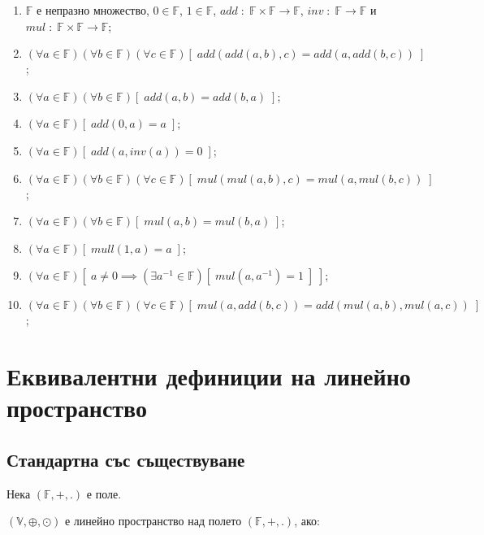 \documentclass{article}[12pt]
\begin{document}
\begin{enumerate}
\item \(\mathbb{F}\) е непразно множество, \(0 \in \mathbb{F}\), \(1 \in \mathbb{F}\), \(add \; : \; \mathbb{F} \times \mathbb{F} \to \mathbb{F}\), \(inv \; : \; \mathbb{F} \to \mathbb{F}\) и \(mul \; : \; \mathbb{F} \times \mathbb{F} \to \mathbb{F}\);
\item \((\forall a \in \mathbb{F})(\forall b \in \mathbb{F})(\forall c \in \mathbb{F})[\; add(add(a, b), c) = add(a, add(b, c)) \;]\);
\item \((\forall a \in \mathbb{F})(\forall b \in \mathbb{F})[\; add(a, b) = add(b, a) \;]\);
\item \((\forall a \in \mathbb{F})[\; add(0, a) = a \;]\);
\item \((\forall a \in \mathbb{F})[\; add(a, inv(a)) = 0 \;]\);
\item \((\forall a \in \mathbb{F})(\forall b \in \mathbb{F})(\forall c \in \mathbb{F})[\; mul(mul(a, b), c) = mul(a, mul(b, c)) \;]\);
\item \((\forall a \in \mathbb{F})(\forall b \in \mathbb{F})[\; mul(a, b) = mul(b, a) \;]\);
\item \((\forall a \in \mathbb{F})[\; mull(1, a) = a \;]\);
\item \((\forall a \in \mathbb{F})[\; a \neq 0 \implies (\exists a^{-1} \in \mathbb{F})[\; mul(a,  a^{-1}) = 1 \;] \;]\);
\item \((\forall a \in \mathbb{F})(\forall b \in \mathbb{F})(\forall c \in \mathbb{F})[\; mul(a, add(b, c)) = add(mul(a, b), mul(a, c)) \;]\);
\end{enumerate}

\section{Еквивалентни дефиниции на линейно пространство}

\subsection{Стандартна със съществуване}

Нека \((\mathbb{F}, +, .)\) е поле.

\((\mathbb{V}, \oplus, \odot)\) е линейно пространство над полето \((\mathbb{F}, +, .)\), ако:
\end{document}
